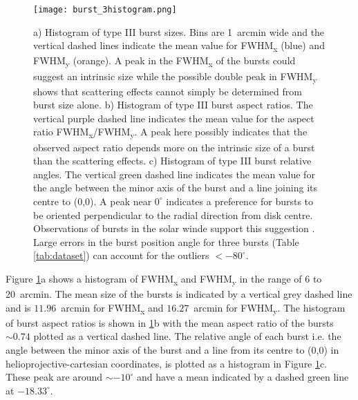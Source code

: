 \begin{figure}[ht]
\centering
\texttt{[image: burst\_3histogram.png]}
\caption[Histograms of type III burst sizes, aspect ratios and relative angles.]{a) Histogram of type III burst sizes. Bins are 1~arcmin wide and the vertical dashed lines indicate the mean value for FWHM\textsubscript{x} (blue) and FWHM\textsubscript{y} (orange). A peak in the FWHM\textsubscript{x} of the bursts could suggest an intrinsic size while the possible double peak in FWHM\textsubscript{y} shows that scattering effects cannot simply be determined from burst size alone. b) Histogram of type III burst aspect ratios. The vertical purple dashed line indicates the mean value for the aspect ratio FWHM\textsubscript{x}/FWHM\textsubscript{y}. A peak here possibly indicates that the observed aspect ratio depends more on the intrinsic size of a burst than the scattering effects. c) Histogram of type III burst relative angles. The vertical green dashed line indicates the mean value for the angle between the minor axis of the burst and a line joining its centre to (0,0). A peak near $0^\circ$ indicates a preference for bursts to be oriented perpendicular to the radial direction from disk centre. Observations of bursts in the solar winde support this suggestion \citep{Anantharamaiah1994,SasikumarRaja2016}. Large errors in the burst position angle for three bursts (Table \ref{tab:dataset}) can account for the outliers $< -80^\circ$.}
\label{fig:burst_hist}
\end{figure}

Figure \ref{fig:burst_hist}a shows a histogram of FWHM\textsubscript{x} and FWHM\textsubscript{y} in the range of 6 to 20~arcmin. The mean size of the bursts is indicated by a vertical grey dashed line and is $11.96$~arcmin for FWHM\textsubscript{x} and $16.27$~arcmin for FWHM\textsubscript{y}. The histogram of burst aspect ratios is shown in \ref{fig:burst_hist}b with the mean aspect ratio of the bursts $\sim 0.74$ plotted as a vertical dashed line. 
The relative angle of each burst i.e. the angle between the minor axis of the burst and a line from its centre to (0,0) in helioprojective-cartesian coordinates, is plotted as a histogram in Figure \ref{fig:burst_hist}c. These peak are around $\sim -10^\circ$ and have a mean indicated by a dashed green line at $-18.33^\circ$.

